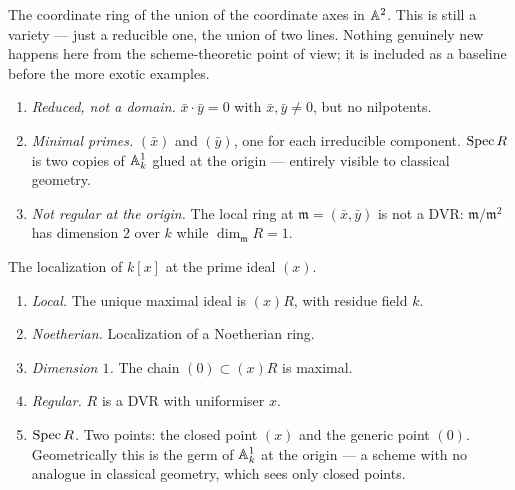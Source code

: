 \documentclass[a4paper, 12pt]{article}
\begin{document}
\begin{example}[{$R = k[x,y]/(xy)$, two lines meeting at a point}]
The coordinate ring of the union of the coordinate axes in $\AA^2$.
This is still a variety — just a reducible one, the union of two lines.
Nothing genuinely new happens here from the scheme-theoretic point of view;
it is included as a baseline before the more exotic examples.
\leavevmode\begin{enumerate}
\item \emph{Reduced, not a domain.} $\bar x \cdot \bar y = 0$ with
  $\bar x, \bar y \neq 0$, but no nilpotents.
\item \emph{Minimal primes.} $(\bar x)$ and $(\bar y)$, one for each irreducible
  component. $\Spec R$ is two copies of $\AA^1_k$ glued at the origin —
  entirely visible to classical geometry.
\item \emph{Not regular at the origin.} The local ring at
  $\mathfrak{m} = (\bar x, \bar y)$ is not a DVR:
  $\mathfrak{m}/\mathfrak{m}^2$ has dimension $2$ over $k$
  while $\dim_{\mathfrak{m}} R = 1$.
\end{enumerate}
\end{example}


\begin{example}[{$R = k[x]_{(x)}$, localization at a point}]
The localization of $k[x]$ at the prime ideal $(x)$.
\leavevmode\begin{enumerate}
\item \emph{Local.} The unique maximal ideal is $(x)R$, with residue field $k$.
\item \emph{Noetherian.} Localization of a Noetherian ring.
\item \emph{Dimension $1$.} The chain $(0) \subset (x)R$ is maximal.
\item \emph{Regular.} $R$ is a DVR with uniformiser $x$.
\item \emph{$\Spec R$.} Two points: the closed point $(x)$ and the generic
  point $(0)$. Geometrically this is the germ of $\AA^1_k$ at the origin —
  a scheme with no analogue in classical geometry, which sees only closed points.
\end{enumerate}
\end{example}

\end{document}

